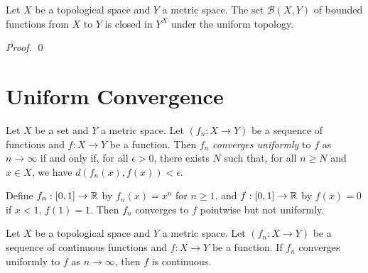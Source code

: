 \begin{theorem}
    Let $X$ be a topological space and $Y$ a metric space. The set $\mathcal{B}(X,Y)$ of bounded functions from $X$ to $Y$
    is closed in $Y^X$ under the uniform topology.
\end{theorem}

\begin{proof}
    \pf
    \qed
\end{proof}

\section{Uniform Convergence}

\begin{definition}
    Let $X$ be a set and $Y$ a metric space. Let $(f_n : X \rightarrow Y)$ be a sequence of functions and $f : X \rightarrow Y$ be a function.
    Then $f_n$ \emph{converges uniformly} to $f$ as $n \rightarrow \infty$ if and only if, for all $\epsilon > 0$, there exists $N$ such that, for all $n \geq N$ and $x \in X$,
    we have $d(f_n(x),f(x)) < \epsilon$.
\end{definition}

\begin{example}
    Define $f_n : [0,1] \rightarrow \mathbb{R}$ by $f_n(x) = x^n$ for $n \geq 1$, and $f : [0,1] \rightarrow \mathbb{R}$ by $f(x) = 0$ if $x < 1$, $f(1) = 1$.  Then $f_n$ converges to $f$
    pointwise but not uniformly.
\end{example}

\begin{theorem}
    Let $X$ be a topological space and $Y$ a metric space.  Let $(f_n : X \rightarrow Y)$ be a sequence of continuous functions and $f : X \rightarrow Y$ be a function.
    If $f_n$ converges uniformly to $f$ as $n \rightarrow \infty$, then $f$ is continuous.
\end{theorem}

